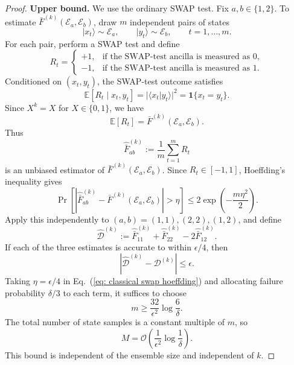 \documentclass[aps,prx,reprint,superscriptaddress,amsmath,amssymb,longbibliography,floatfix]{revtex4-2}
\newcommand{\abs}[1]{\lvert #1\rvert}
\providecommand{\ket}[1]{|#1 \rangle}
\providecommand{\braket}[2]{\langle #1|#2 \rangle}
\newcommand{\dsE}{\mathbb{E}}
\newcommand{\scD}{\mathcal{D}}
\newcommand{\scE}{\mathcal{E}}
\newcommand{\scO}{\mathcal{O}}
\theoremstyle{plain}
\theoremstyle{definition}
\theoremstyle{remark}
\begin{document}
\begin{proof}
\textbf{Upper bound.}
We use the ordinary SWAP test. Fix \(a,b\in\{1,2\}\). To estimate \(\bar F^{(k)}(\scE_a,\scE_b)\), draw \(m\) independent pairs of states
\[
    \ket{x_t}\sim \scE_a,
    \qquad
    \ket{y_t}\sim \scE_b,
    \qquad
    t=1,\ldots,m .
\]
For each pair, perform a SWAP test and define
\[
    R_t=
    \begin{cases}
        +1, & \text{if the SWAP-test ancilla is measured as }0,\\
        -1, & \text{if the SWAP-test ancilla is measured as }1.
    \end{cases}
\]
Conditioned on \((x_t,y_t)\), the SWAP-test outcome satisfies
\begin{equation}
    \dsE[R_t\mid x_t,y_t]
    =
    \abs{\braket{x_t}{y_t}}^2
    =
    \mathbf 1\{x_t=y_t\}.
\end{equation}
Since \(X^k=X\) for \(X\in\{0,1\}\), we have
\begin{equation}
    \dsE[R_t]
    =
    \bar F^{(k)}(\scE_a,\scE_b).
\end{equation}
Thus
\begin{equation}
    \widehat{\bar F}^{(k)}_{ab}
    :=
    \frac1m\sum_{t=1}^m R_t
\end{equation}
is an unbiased estimator of \(\bar F^{(k)}(\scE_a,\scE_b)\). Since \(R_t\in[-1,1]\), Hoeffding's inequality gives
\begin{equation}
    \Pr\!\left[
        \left|
        \widehat{\bar F}^{(k)}_{ab}
        -
        \bar F^{(k)}(\scE_a,\scE_b)
        \right|
        >
        \eta
    \right]
    \le
    2\exp\!\left(-\frac{m\eta^2}{2}\right).
    \label{eq: classical swap hoeffding}
\end{equation}
Apply this independently to \((a,b)=(1,1),(2,2),(1,2)\), and define
\begin{equation}
    \widehat{\scD}^{(k)}
    :=
    \widehat{\bar F}^{(k)}_{11}
    +
    \widehat{\bar F}^{(k)}_{22}
    -
    2\widehat{\bar F}^{(k)}_{12}.
\end{equation}
If each of the three estimates is accurate to within \(\epsilon/4\), then
\begin{equation}
    \left|
    \widehat{\scD}^{(k)}
    -
    \scD^{(k)}
    \right|
    \le
    \epsilon .
\end{equation}
Taking \(\eta=\epsilon/4\) in Eq.~(\ref{eq: classical swap hoeffding}) and allocating failure probability \(\delta/3\) to each term, it suffices to choose
\begin{equation}
    m
    \ge
    \frac{32}{\epsilon^2}\log\frac{6}{\delta}.
\end{equation}
The total number of state samples is a constant multiple of \(m\), so
\begin{equation}
    M
    =
    \scO\!\left(
        \frac{1}{\epsilon^2}\log\frac1\delta
    \right).
\end{equation}
This bound is independent of the ensemble size and independent of \(k\).


\end{proof}
\end{document}
